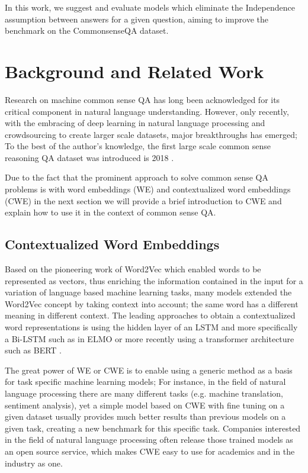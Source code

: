 \documentclass{article}
\begin{document}
In this work, we suggest and evaluate models which eliminate the Independence assumption between answers for a given question, aiming to improve the benchmark on the CommonsenseQA dataset. 

\section{Background and Related Work}
Research on machine common sense QA has long been acknowledged for its critical component in natural language understanding. However, only recently, with the embracing of deep learning in natural language processing and crowdsourcing to create larger scale datasets, major breakthroughs has emerged; To the best of the author's knowledge, the first large scale common sense reasoning QA dataset was introduced is 2018 \cite{storks2019commonsense}.

Due to the fact that the prominent approach to solve common sense QA problems is with word embeddings (WE) and contextualized word embeddings (CWE) in the next section we will provide a brief introduction to CWE and explain how to use it in the context of common sense QA.


\subsection{Contextualized Word Embeddings}
Based on the pioneering work of Word2Vec \cite{mikolov2013distributed} which enabled words to be represented as vectors, thus
enriching the information contained in the input for a variation of language based machine learning tasks, many models extended the Word2Vec concept by taking context into account; the same word has a different meaning in different context. The leading approaches to obtain a contextualized word representations is using the hidden layer of an LSTM \cite{hochreiter1997long} and more specifically a Bi-LSTM such as in ELMO \cite{peters2018deep} or more recently using a transformer architecture such as BERT \cite{devlin2018bert,yang2019xlnet}.

The great power of WE or CWE is to enable using a generic method as a basis for task specific machine learning models; For instance, in the field of natural language processing there are many different tasks (e.g. machine translation, sentiment analysis), yet a simple model based on CWE with fine tuning on a given dataset usually provides much better results than previous models on a given task, creating a new benchmark for this specific task. Companies interested in the field of natural language processing often release those trained models as an open source service, which makes CWE easy to use for academics and in the industry as one.
\end{document}
